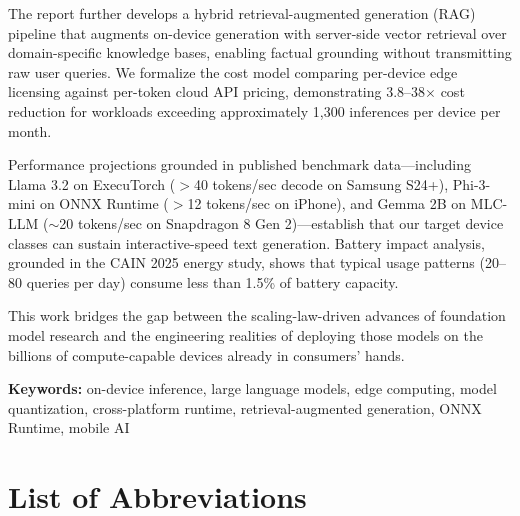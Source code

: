 \documentclass[12pt, letterpaper, twoside]{report}
\begin{document}
The report further develops a hybrid retrieval-augmented generation (RAG) pipeline that augments on-device generation with server-side vector retrieval over domain-specific knowledge bases, enabling factual grounding without transmitting raw user queries. We formalize the cost model comparing per-device edge licensing against per-token cloud API pricing, demonstrating 3.8--38$\times$ cost reduction for workloads exceeding approximately 1,300 inferences per device per month.

Performance projections grounded in published benchmark data---including Llama 3.2 on ExecuTorch ($>$40 tokens/sec decode on Samsung S24+), Phi-3-mini on ONNX Runtime ($>$12 tokens/sec on iPhone), and Gemma 2B on MLC-LLM ($\sim$20 tokens/sec on Snapdragon 8 Gen 2)---establish that our target device classes can sustain interactive-speed text generation. Battery impact analysis, grounded in the CAIN 2025 energy study, shows that typical usage patterns (20--80 queries per day) consume less than 1.5\% of battery capacity.

This work bridges the gap between the scaling-law-driven advances of foundation model research and the engineering realities of deploying those models on the billions of compute-capable devices already in consumers' hands.

\vspace{0.8cm}
\noindent\textbf{Keywords:} on-device inference, large language models, edge computing, model quantization, cross-platform runtime, retrieval-augmented generation, ONNX Runtime, mobile AI

\clearpage

\tableofcontents
\clearpage
\listoffigures
\clearpage
\listoftables
\clearpage

\chapter*{List of Abbreviations}
\end{document}
